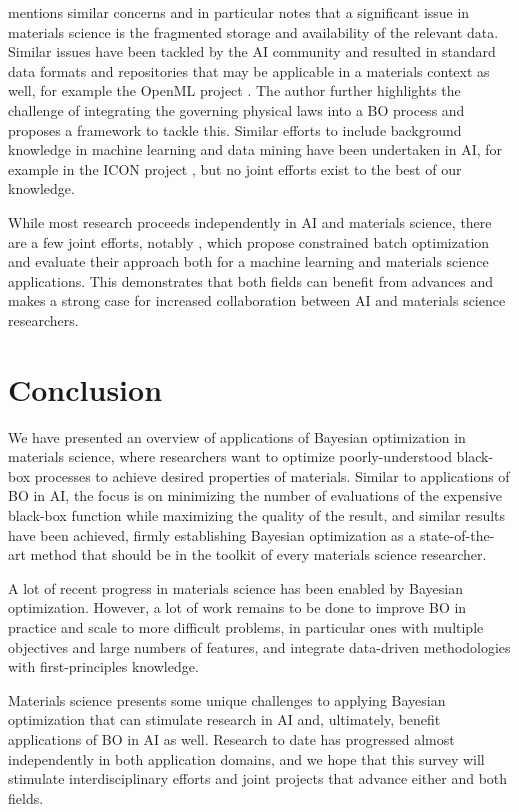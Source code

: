 \documentclass{article}
\begin{document}
\cite{kalidindi_2019} mentions similar concerns and in particular notes that a
significant issue in materials science is the fragmented storage and
availability of the relevant data. Similar issues have been tackled by the AI
community and resulted in standard data formats and repositories that may be
applicable in a materials context as well, for example the OpenML project
\cite{vanschoren_openml_2013}. The author further highlights the challenge of
integrating the governing physical laws into a BO process and proposes a
framework to tackle this. Similar efforts to include background knowledge in
machine learning and data mining have been undertaken in AI, for example in the
ICON project \cite{bessiere_data_2016}, but no joint efforts exist to the best
of our knowledge.

While most research proceeds independently in AI and materials science, there
are a few joint efforts, notably \cite{vellanki2017}, which propose constrained
batch optimization and evaluate their approach both for a machine learning and
materials science applications. This demonstrates that both fields can benefit
from advances and makes a strong case for increased collaboration between AI and
materials science researchers.

\section{Conclusion}

We have presented an overview of applications of Bayesian optimization in
materials science, where researchers want to optimize poorly-understood
black-box processes to achieve desired properties of materials. Similar to
applications of BO in AI, the focus is on minimizing the number of evaluations
of the expensive black-box function while maximizing the quality of the result,
and similar results have been achieved, firmly establishing Bayesian
optimization as a state-of-the-art method that should be in the toolkit of every
materials science researcher.

A lot of recent progress in materials science has been enabled by Bayesian
optimization. However, a lot of work remains to be done to improve BO in
practice and scale to more difficult problems, in particular ones with multiple
objectives and large numbers of features, and integrate data-driven
methodologies with first-principles knowledge.

Materials science presents some unique challenges to applying Bayesian
optimization that can stimulate research in AI and, ultimately, benefit
applications of BO in AI as well. Research to date has progressed almost
independently in both application domains, and we hope that this survey will
stimulate interdisciplinary efforts and joint projects that advance either and
both fields.




\end{document}
